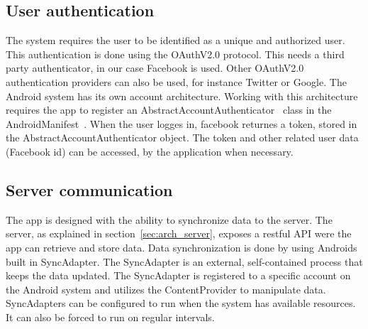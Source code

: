 \subsection{User authentication}

The system requires the user to be identified as a unique and authorized user. This authentication is done using the OAuthV2.0 protocol. This needs a third party authenticator, in our case Facebook is used. Other OAuthV2.0 authentication providers can also be used, for instance Twitter or Google.
The Android system has its own account architecture. Working with this architecture requires the app to register an AbstractAccountAuthenticator~\cite{androidAccount} class in the AndroidManifest~\cite{androidmanifest}. When the user logges in, facebook returnes a token, stored in the AbstractAccountAuthenticator object. The token and other related user data (Facebook id) can be accessed, by the application when necessary.

\subsection{Server communication}
The app is designed with the ability to synchronize data to the server. The server, as explained in section~\ref{sec:arch_server}, exposes a restful API were the app can retrieve and store data. Data synchronization is done by using Androids built in SyncAdapter. The SyncAdapter is an external, self-contained process that keeps the data updated. The SyncAdapter is registered to a specific account on the Android system and utilizes the ContentProvider to manipulate data. SyncAdapters can be configured to run when the system has available resources. It can also be forced to run on regular intervals.
